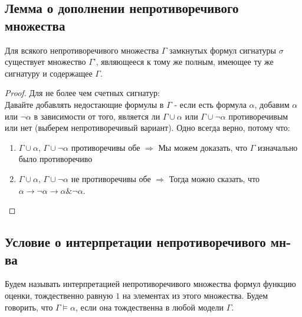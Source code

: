 \subsection{Лемма о дополнении непротиворечивого множества}
\label{sec-8-2}
\begin{lemma}
Для всякого непротиворечивого множества $\Gamma$ замкнутых формул сигнатуры $\sigma$ существует множество $\Gamma’$, являющееся к тому же полным, имеющее ту же сигнатуру и содержащее $\Gamma$.
\end{lemma}
\begin{proof}
Для не более чем счетных сигнатур:\\
Давайте добавлять недостающие формулы в $\Gamma$ - если есть формула $\alpha$, добавим $\alpha$ или $\neg \alpha$ в зависимости от того, является ли $\Gamma \cup \alpha$ или $\Gamma \cup \neg \alpha$ противоречивым или нет (выберем непротиворечивый вариант). Одно всегда верно, потому что:
\begin{enumerate}
\item $\Gamma \cup \alpha$, $\Gamma \cup \neg \alpha$ противоречивы обе $\Rightarrow$ Мы можем доказать, что $\Gamma$ изначально было противоречиво
\item $\Gamma \cup \alpha$, $\Gamma \cup \neg \alpha$ не противоречивы обе $\Rightarrow$ Тогда можно сказать, что $\alpha \to \neg \alpha \to \alpha \& \neg \alpha$.
\end{enumerate}
\end{proof}
\subsection{Условие о интерпретации непротиворечивого мн-ва}
\label{sec-8-3}
Будем называть интерпретацией непротиворечивого множества формул функцию оценки, тождественно равную $1$ на элементах из этого множества. Будем говорить, что $\Gamma \models \alpha$, если она тождественна в любой модели $\Gamma$.
